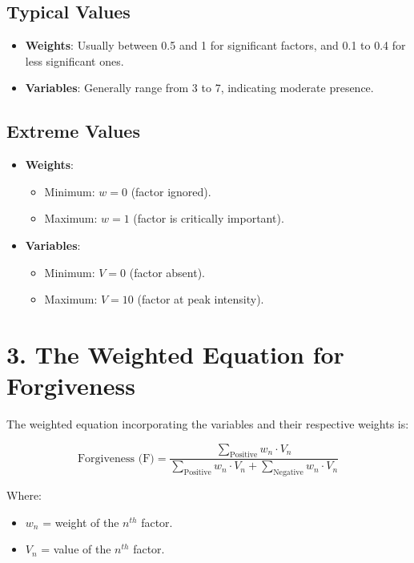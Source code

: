 \documentclass{article}
\begin{document}
\subsection*{Typical Values}

\begin{itemize}
    \item \textbf{Weights}: Usually between 0.5 and 1 for significant factors, and 0.1 to 0.4 for less significant ones.
    \item \textbf{Variables}: Generally range from 3 to 7, indicating moderate presence.
\end{itemize}

\subsection*{Extreme Values}

\begin{itemize}
    \item \textbf{Weights}:
    \begin{itemize}
        \item Minimum: $w = 0$ (factor ignored).
        \item Maximum: $w = 1$ (factor is critically important).
    \end{itemize}
    \item \textbf{Variables}:
    \begin{itemize}
        \item Minimum: $V = 0$ (factor absent).
        \item Maximum: $V = 10$ (factor at peak intensity).
    \end{itemize}
\end{itemize}

\section*{3. The Weighted Equation for Forgiveness}

The weighted equation incorporating the variables and their respective weights is:

\[
\text{Forgiveness (F)} = \frac{\sum_{\text{Positive}} w_n \cdot V_n}{\sum_{\text{Positive}} w_n \cdot V_n + \sum_{\text{Negative}} w_n \cdot V_n}
\]

Where:

\begin{itemize}
    \item $w_n$ = weight of the $n^{th}$ factor.
    \item $V_n$ = value of the $n^{th}$ factor.
\end{itemize}
\end{document}
